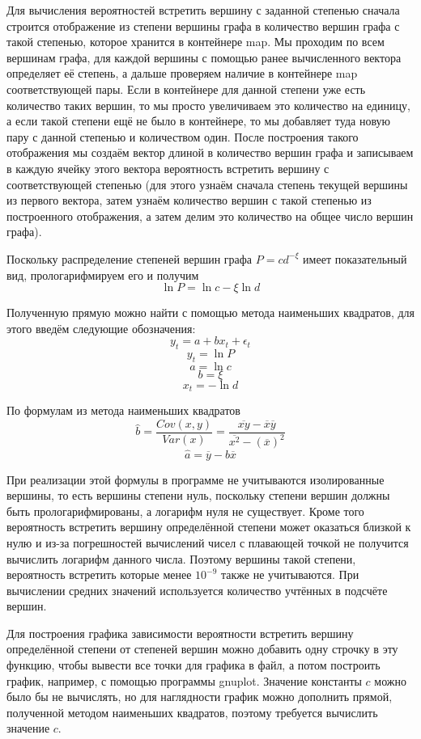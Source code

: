\documentclass[14pt]{extreport}
\begin{document}
Для вычисления вероятностей встретить вершину с заданной степенью сначала строится отображение из степени вершины графа в количество вершин графа с такой степенью, которое хранится в контейнере map. Мы проходим по всем вершинам графа, для каждой вершины с помощью ранее вычисленного вектора определяет её степень, а дальше проверяем наличие в контейнере map соответствующей пары. Если в контейнере для данной степени уже есть количество таких вершин, то мы просто увеличиваем это количество на единицу, а если такой степени ещё не было в контейнере, то мы добавляет туда новую пару с данной степенью и количеством один. После построения такого отображения мы создаём вектор длиной в количество вершин графа и записываем в каждую ячейку этого вектора вероятность встретить вершину с соответствующей степенью (для этого узнаём сначала степень текущей вершины из первого вектора, затем узнаём количество вершин с такой степенью из построенного отображения, а затем делим это количество на общее число вершин графа).

Поскольку распределение степеней вершин графа $P = c d^{-\xi}$ имеет показательный вид, прологарифмируем его и получим
$$
\ln{P} = \ln{c} - \xi \ln{d}
$$

Полученную прямую можно найти с помощью метода наименьших квадратов, для этого введём следующие обозначения:
$$
y_t = a + b x_t + \epsilon_t
$$
$$
y_t = \ln{P}
$$
$$
a = \ln{c}
$$
$$
b = \xi
$$
$$
x_t = -\ln{d}
$$

По формулам из метода наименьших квадратов
$$
\hat{b} = \frac{Cov(x,y)}{Var(x)} = \frac{\overline{x y}-\overline{x}\overline{y}}{\overline{x^2}-\left(\overline{x}\right)^2}
$$
$$
\hat{a} = \overline{y} - b\overline{x}
$$

При реализации этой формулы в программе не учитываются изолированные вершины, то есть вершины степени нуль, поскольку степени вершин должны быть прологарифмированы, а логарифм нуля не существует. Кроме того вероятность встретить вершину определённой степени может оказаться близкой к нулю и из-за погрешностей вычислений чисел с плавающей точкой не получится вычислить логарифм данного числа. Поэтому вершины такой степени, вероятность встретить которые менее $10^{-9}$ также не учитываются. При вычислении средних значений используется количество учтённых в подсчёте вершин.

Для построения графика зависимости вероятности встретить вершину определённой степени от степеней вершин можно добавить одну строчку в эту функцию, чтобы вывести все точки для графика в файл, а потом построить график, например, с помощью программы gnuplot. Значение константы $c$ можно было бы не вычислять, но для наглядности график можно дополнить прямой, полученной методом наименьших квадратов, поэтому требуется вычислить значение $c$.
\end{document}
